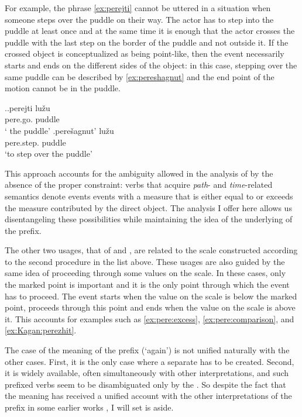 For example, the phrase \ref{ex:perejti} cannot be uttered in a situation when someone steps over the puddle on their way. The actor has to step into the puddle at least once and at the same time it is enough that the actor crosses the puddle with the last step on the border of the puddle and not outside it. If the crossed object is conceptualized as being point-like, then the event necessarily starts and ends on the different sides of the object: in this case, stepping over the same puddle can be described by \ref{ex:pereshagnut} and the end point of the motion cannot be in the puddle.


\ex.\ag.\label{ex:perejti}perejti lu\v{z}u\\
pere.go. puddle\\
\trans ` the puddle'
\bg.\label{ex:pereshagnut}pere\v{s}agnut' lu\v{z}u\\
pere.step. puddle\\
\trans `to step over the puddle'

This approach accounts for the ambiguity allowed in the analysis of \citet{Kagan:book} by the absence of the proper  constraint: verbs that acquire \textit{path}- and \textit{time}-related semantics denote events events with a measure that is either equal to or exceeds the measure contributed by the direct object. The analysis I offer here allows us disentangeling these possibilities while maintaining the idea of the underlying  of the prefix.

The other two usages, that of  and , are related to the scale constructed according to the second procedure in the list above. These usages are also guided by the same idea of proceeding through some values on the scale. In these cases, only the marked point is important and it is the only point through which the event has to proceed. The event starts when the value on the scale is below the marked point, proceeds through this point and ends when the value on the scale is above it. This accounts for examples such as \ref{ex:pere:excess}, \ref{ex:pere:comparison}, and \ref{ex:Kagan:perezhit}.

The case of the  meaning of the prefix (`again') is not unified naturally with the other cases. First, it is the only case where a separate  has to be created. Second, it is widely available, often simultaneously with other interpretations, and such prefixed verbs seem to be disambiguated only by the . So despite the fact that the  meaning has received a unified account with the other interpretations of the prefix  in some earlier works \citep{Demjjanow:97, Kagan:book}, I will set is aside.

